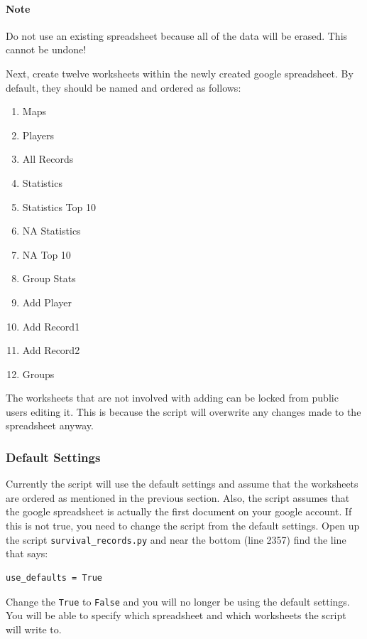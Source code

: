 \paragraph{Note} Do not use an existing spreadsheet because all of the data will be erased. This cannot be undone!

Next, create twelve worksheets within the newly created google spreadsheet. By default, they should be named and ordered as follows:
\begin{enumerate}
\item Maps
\item Players
\item All Records
\item Statistics
\item Statistics Top 10
\item NA Statistics
\item NA Top 10
\item Group Stats
\item Add Player
\item Add Record1
\item Add Record2
\item Groups
\end{enumerate}
The worksheets that are not involved with adding can be locked from public users editing it. This is because the script will overwrite any changes made to the spreadsheet anyway.

\subsubsection{Default Settings}
Currently the script will use the default settings and assume that the worksheets are ordered as mentioned in the previous section. Also, the script assumes that the google spreadsheet is actually the first document on your google account. If this is not true, you need to change the script from the default settings. Open up the script \texttt{survival\_records.py} and near the bottom (line 2357) find the line that says:

\begin{lstlisting}
use_defaults = True
\end{lstlisting}

Change the \texttt{True} to \texttt{False} and you will no longer be using the default settings. You will be able to specify which spreadsheet and which worksheets the script will write to.
